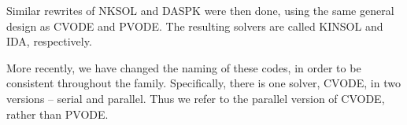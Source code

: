 Similar rewrites of NKSOL and DASPK were then done, using the same
general design as CVODE and PVODE.  The resulting solvers are called
KINSOL and IDA, respectively.

More recently, we have changed the naming of these codes, in order
to be consistent throughout the family.  Specifically, there is
one solver, CVODE, in two versions -- serial and parallel.  Thus
we refer to the parallel version of CVODE, rather than PVODE.


